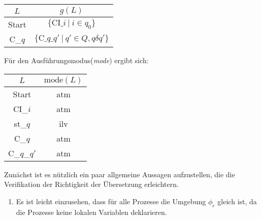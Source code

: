 \begin{tabular}{|c|c|}
  \hline
  $L$ & $g(L)$\\
  \hline
  Start & $\{ \textrm{CI\_}i\ |\ i\in q_0 \}$\\
  C\_$q$ & $\{ \textrm{C\_}q\textrm{\_}q'\ |\ q'\in Q, q\delta q' \}$\\
  \hline
\end{tabular}

Für den Ausführungsmodus(\emph{mode}) ergibt sich:

\begin{tabular}{|c|c|}
  \hline
  $L$ & $\textrm{mode}(L)$\\
  \hline
  Start & atm\\
  CI\_$i$ & atm\\
  st\_$q$ & ilv\\
  C\_$q$ & atm\\
  C\_$q$\_$q'$ & atm\\
  \hline
\end{tabular}

Zunächst ist es nützlich ein paar allgemeine Aussagen aufzustellen, die die Verifikation der Richtigkeit der Übersetzung erleichtern.
\begin{enumerate}
\item Es ist leicht einzusehen, dass für alle Prozesse die Umgebung $\phi_e$ gleich ist, da die Prozesse keine lokalen Variablen deklarieren.
\end{enumerate}

